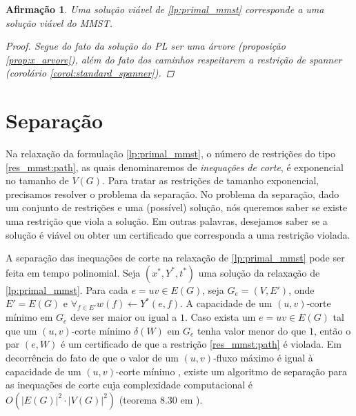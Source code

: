 \documentclass[11pt,reqno]{amsart}
\newtheorem{afirmacao}{Afirmação}[teorema]
\begin{document}
\begin{afirmacao}
Uma solução viável de \ref{lp:primal_mmst} corresponde a uma solução viável 
do MMST.
\begin{proof}
Segue do fato da solução do PL ser uma árvore (proposição 
\ref{prop:x_arvore}), além do fato dos caminhos respeitarem a restrição 
de spanner (corolário \ref{corol:standard_spanner}). 
\end{proof}
\end{afirmacao}

\section{Separação}

Na relaxação da formulação \ref{lp:primal_mmst}, o número de restrições do 
tipo \ref{res_mmst:path}, as quais denominaremos de 
\emph{inequações de corte}, é exponencial no tamanho de $V(G)$. 
Para tratar 
as restrições de tamanho exponencial, precisamos resolver o problema da 
separação. No problema da separação, dado um conjunto de restrições e uma 
(possível) solução, nós queremos saber se existe uma restrição que viola a 
solução. 
Em outras palavras, desejamos saber se a solução é viável ou obter um 
certificado que corresponda a uma restrição violada. 

A separação das inequações de corte na relaxação de \ref{lp:primal_mmst} 
pode ser feita em tempo polinomial. Seja $(x^*, Y^*, t^*)$ uma solução 
da relaxação de \ref{lp:primal_mmst}. 
Para cada $e=uv \in E(G)$, seja $G_{e} = (V, E')$, onde 
$E' = E(G)$ e $\forall_{f \in E'}w(f) \leftarrow Y^*(e,f)$. A capacidade de 
um $(u,v)$-corte mínimo em $G_{e}$ deve ser maior ou igual a $1$. Caso 
exista 
um $e=uv \in E(G)$ tal que um $(u,v)$-corte mínimo $\delta(W)$ em $G_{e}$ 
tenha valor menor do que $1$, então o par $(e,W)$ é um certificado de que a 
restrição \ref{res_mmst:path} é violada. Em decorrência do fato de que 
o valor de um $(u,v)$-fluxo máximo é igual à capacidade de um 
$(u,v)$-corte mínimo \cite{DantzigF1956}, existe um algoritmo de 
separação para as inequações de corte cuja complexidade 
computacional é $O(|E(G)|^{2} \cdot |V(G)|^{2})$ (teorema 8.30 em 
\cite{KorteV2012}).

 

 
\end{document}

